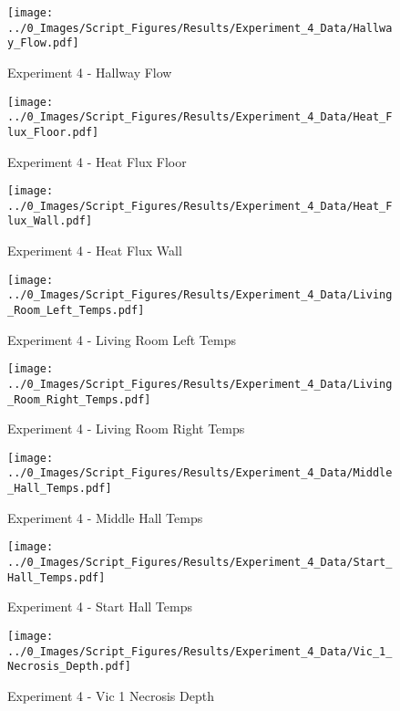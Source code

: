 	\clearpage

	\begin{figure}[H]
		\centering
		\texttt{[image: ../0\_Images/Script\_Figures/Results/Experiment\_4\_Data/Hallway\_Flow.pdf]}
		\caption[]{Experiment 4 - Hallway Flow}
	\end{figure}
 

	\begin{figure}[H]
		\centering
		\texttt{[image: ../0\_Images/Script\_Figures/Results/Experiment\_4\_Data/Heat\_Flux\_Floor.pdf]}
		\caption[]{Experiment 4 - Heat Flux Floor}
	\end{figure}
 
	\clearpage

	\begin{figure}[H]
		\centering
		\texttt{[image: ../0\_Images/Script\_Figures/Results/Experiment\_4\_Data/Heat\_Flux\_Wall.pdf]}
		\caption[]{Experiment 4 - Heat Flux Wall}
	\end{figure}
 

	\begin{figure}[H]
		\centering
		\texttt{[image: ../0\_Images/Script\_Figures/Results/Experiment\_4\_Data/Living\_Room\_Left\_Temps.pdf]}
		\caption[]{Experiment 4 - Living Room Left Temps}
	\end{figure}
 
	\clearpage

	\begin{figure}[H]
		\centering
		\texttt{[image: ../0\_Images/Script\_Figures/Results/Experiment\_4\_Data/Living\_Room\_Right\_Temps.pdf]}
		\caption[]{Experiment 4 - Living Room Right Temps}
	\end{figure}
 

	\begin{figure}[H]
		\centering
		\texttt{[image: ../0\_Images/Script\_Figures/Results/Experiment\_4\_Data/Middle\_Hall\_Temps.pdf]}
		\caption[]{Experiment 4 - Middle Hall Temps}
	\end{figure}
 
	\clearpage

	\begin{figure}[H]
		\centering
		\texttt{[image: ../0\_Images/Script\_Figures/Results/Experiment\_4\_Data/Start\_Hall\_Temps.pdf]}
		\caption[]{Experiment 4 - Start Hall Temps}
	\end{figure}
 

	\begin{figure}[H]
		\centering
		\texttt{[image: ../0\_Images/Script\_Figures/Results/Experiment\_4\_Data/Vic\_1\_Necrosis\_Depth.pdf]}
		\caption[]{Experiment 4 - Vic 1 Necrosis Depth}
	\end{figure}
 
